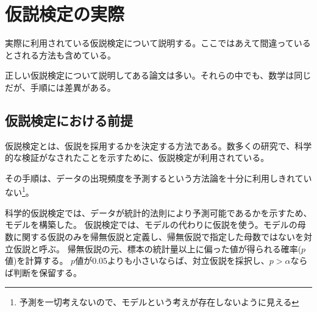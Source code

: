 \chapter{仮説検定の実際}
実際に利用されている仮説検定について説明する。ここではあえて間違っているとされる方法も含めている。

正しい仮説検定について説明してある論文は多い。それらの中でも、数学は同じだが、手順には差異がある。


\section{仮説検定における前提}
仮説検定とは、仮説を採用するかを決定する方法である。数多くの研究で、科学的な検証がなされたことを示すために、仮説検定が利用されている。

その手順は、データの出現頻度を予測するという方法論を十分に利用しきれていない\footnote{予測を一切考えないので、モデルという考えが存在しないように見える}。


科学的仮説検定では、データが統計的法則により予測可能であるかを示すため、モデルを構築した。
仮説検定では、モデルの代わりに仮説を使う。モデルの母数に関する仮説のみを帰無仮説と定義し、帰無仮説で指定した母数ではないを対立仮説と呼ぶ。
帰無仮説の元、標本の統計量以上に偏った値が得られる確率($p$値)を計算する。
$p$値が$0.05$よりも小さいならば、対立仮説を採択し、$p>\alpha$ならば判断を保留する。

